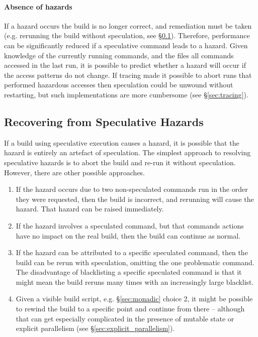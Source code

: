 \paragraph{Absence of hazards} If a hazard occurs the build is no longer correct, and remediation must be taken (e.g. rerunning the build without speculation, see \S\ref{sec:recovering}). Therefore, performance can be significantly reduced if a speculative command leads to a hazard. Given knowledge of the currently running commands, and the files all commands accessed in the last run, it is possible to predict whether a hazard will occur if the access patterns do not change. If tracing made it possible to abort runs that performed hazardous accesses then speculation could be unwound without restarting, but such implementations are more cumbersome (see \S\ref{sec:tracing}).

\subsection{Recovering from Speculative Hazards}
\label{sec:recovering}

If a build using speculative execution causes a hazard, it is possible that the hazard is entirely an artefact of speculation. The simplest approach to resolving speculative hazards is to abort the build and re-run it without speculation. However, there are other possible approaches.

\begin{enumerate}
\item If the hazard occurs due to two non-speculated commands run in the order they were requested, then the build is incorrect, and rerunning will cause the hazard. That hazard can be raised immediately.
\item If the hazard involves a speculated command, but that commands actions have no impact on the real build, then the build can continue as normal.
\item If the hazard can be attributed to a specific speculated command, then the build can be rerun with speculation, omitting the one problematic command. The disadvantage of blacklisting a specific speculated command is that it might mean the build reruns many times with an increasingly large blacklist.
\item Given a visible build script, e.g. \S\ref{sec:monadic} choice 2, it might be possible to rewind the build to a specific point and continue from there -- although that can get especially complicated in the presence of mutable state or explicit parallelism (see \S\ref{sec:explicit_parallelism}).
\end{enumerate}

